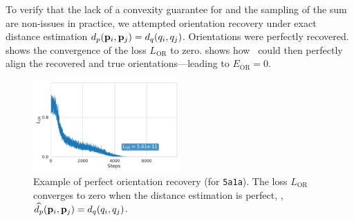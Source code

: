 To verify that the lack of a convexity guarantee for  and the sampling of the sum are non-issues in practice, we attempted orientation recovery under exact distance estimation $d_p(\mathbf{p}_i, \mathbf{p}_j) = d_q(q_i, q_j)$.
Orientations were perfectly recovered.
 shows the convergence of the loss $L_\text{OR}$ to zero.
 shows how~ could then perfectly align the recovered and true orientations---leading to $E_\text{OR} = 0$.

\begin{figure}[ht!]
    \begin{minipage}[t]{0.33\linewidth}
        \centering
        \includegraphics[height=3.5cm]{figures/5a1a_quartercov_uniformS2_perfect_ar_aa}
        \caption{%
            Example of perfect orientation recovery (for \texttt{5a1a}).
            The loss $L_\text{OR}$  converges to zero when the distance estimation is perfect, \ie, $\widehat{d_p}(\mathbf{p}_i, \mathbf{p}_j) = d_q(q_i, q_j)$.
        }\label{fig:5j0n-orientation-recovery-loss}
    \end{minipage}
    \hfill
    \begin{minipage}[t]{0.64\linewidth}

\end{minipage}
\end{figure}
